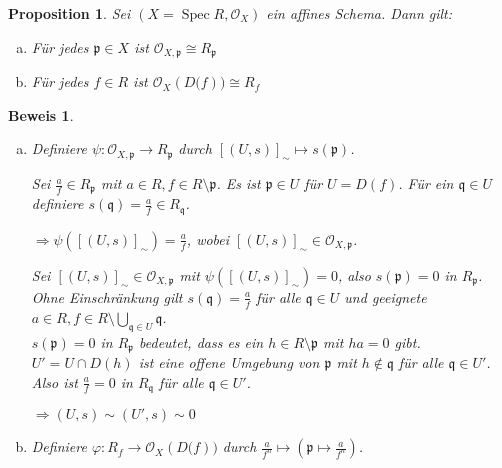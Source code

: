 \documentclass[a4paper,oneside]{scrbook}
\theoremstyle{break}
\newtheorem{Prop}[Def]{Proposition}
\theoremstyle{nonumberbreak}
\theoremstyle{nonumberplain}
\newtheorem{Bew}{Beweis}
\theoremstyle{break}
\renewcommand{\phi}{%
	\ensuremath{\varphi}%
}
\newcommand{\Spec}{%
	\ensuremath{\operatorname{Spec}}%
}
\begin{document}
\begin{Prop}
	Sei $\left(X = \Spec R, \mathcal{O}_X\right)$ ein affines Schema. Dann gilt:
	\begin{enumerate}[(a)]
		\item Für jedes $\mathfrak{p} \in X$ ist $\mathcal{O}_{X,\mathfrak{p}} \cong R_{\mathfrak{p}}$
		\item Für jedes $f \in R$ ist $\mathcal{O}_{X}\left(D(f\right)) \cong R_{f}$
	\end{enumerate}
\end{Prop}
\begin{Bew}
	\begin{enumerate}[(a)]
		\item
			Definiere $\psi\colon \mathcal{O}_{X,\mathfrak{p}} \to R_{\mathfrak{p}}$ durch $[\left(U,s\right)]_{\sim} \mapsto s( \mathfrak{p} )$.

			
				Sei $\frac{a}{f} \in R_{\mathfrak{p}}$ mit $a \in R, f \in R\setminus \mathfrak{p}$.
				Es ist $\mathfrak{p} \in U$ für $U = D\left(f\right)$.
				Für ein $\mathfrak{q} \in U$ definiere $s\left( \mathfrak{q} \right) = \frac{a}{f} \in R_{\mathfrak{q}}$.

				$\Rightarrow \psi\left( [ \left(U,s\right) ]_{\sim} \right) = \frac{a}{f}$, 
				wobei $[ \left(U,s\right) ]_{\sim} \in \mathcal{O}_{X,\mathfrak{p}}$.

				Sei $[\left(U,s\right)]_{\sim} \in \mathcal{O}_{X,\mathfrak{p}}$ mit $\psi( [(U,s)]_{\sim} ) = 0$, also 
				$s \left( \mathfrak{p} \right) = 0$ in $R_{\mathfrak{p}}$.
				Ohne Einschränkung gilt $s\left(\mathfrak{q}\right) = \frac{a}{f}$ für alle $\mathfrak{q} \in U$ und geeignete $a \in R, f \in R \setminus \bigcup_{\mathfrak{q} \in U}\mathfrak{q}$.\\
				$s\left(\mathfrak{p}\right) = 0$ in $R_{\mathfrak{p}}$ bedeutet, dass es ein $h \in R \setminus \mathfrak{p}$ mit
				$ h a = 0$ gibt.
				$U' = U \cap D\left(h\right)$ ist eine offene Umgebung von $\mathfrak{p}$ mit $h \notin \mathfrak{q}$ für alle $\mathfrak{q} \in U'$.
				Also ist $\frac{a}{f} = 0$ in $R_{\mathfrak{q}}$ für alle $\mathfrak{q} \in U'$.

				$\Rightarrow \left(U,s\right) \sim (U',s) \sim 0$
		\item
			Definiere $\phi\colon R_{f} \to \mathcal{O}_{X}\left(D(f\right))$ durch $\frac{a}{f^n} \mapsto ( \mathfrak{p} \mapsto \frac{a}{f^n} )$.


\end{enumerate}
\end{Bew}
\end{document}
